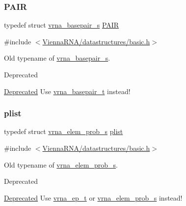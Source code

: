 \subsubsection{\texorpdfstring{P\+A\+IR}{PAIR}}
{\footnotesize\ttfamily typedef struct \hyperlink{group__data__structures_structvrna__basepair__s}{vrna\+\_\+basepair\+\_\+s} \hyperlink{group__data__structures_ga4381025ffbd692e54189b2c679c79c99}{P\+A\+IR}}



{\ttfamily \#include $<$\hyperlink{datastructures_2basic_8h}{Vienna\+R\+N\+A/datastructures/basic.\+h}$>$}



Old typename of \hyperlink{group__data__structures_structvrna__basepair__s}{vrna\+\_\+basepair\+\_\+s}. 

\begin{DoxyRefDesc}{Deprecated}
\item[\hyperlink{deprecated__deprecated000197}{Deprecated}]Use \hyperlink{group__data__structures_gac8c5669d3fb813cacf506489689305ce}{vrna\+\_\+basepair\+\_\+t} instead! \end{DoxyRefDesc}
\mbox{\label{group__data__structures_ga9608eed021ebfbdd7a901cfdc446c8e9}} 
\subsubsection{\texorpdfstring{plist}{plist}}
{\footnotesize\ttfamily typedef struct \hyperlink{group__struct__utils__plist_structvrna__elem__prob__s}{vrna\+\_\+elem\+\_\+prob\+\_\+s} \hyperlink{group__data__structures_ga9608eed021ebfbdd7a901cfdc446c8e9}{plist}}



{\ttfamily \#include $<$\hyperlink{datastructures_2basic_8h}{Vienna\+R\+N\+A/datastructures/basic.\+h}$>$}



Old typename of \hyperlink{group__struct__utils__plist_structvrna__elem__prob__s}{vrna\+\_\+elem\+\_\+prob\+\_\+s}. 

\begin{DoxyRefDesc}{Deprecated}
\item[\hyperlink{deprecated__deprecated000198}{Deprecated}]Use \hyperlink{group__struct__utils__plist_gab9ac98ab55ded9fb90043b024b915aca}{vrna\+\_\+ep\+\_\+t} or \hyperlink{group__struct__utils__plist_structvrna__elem__prob__s}{vrna\+\_\+elem\+\_\+prob\+\_\+s} instead! \end{DoxyRefDesc}
\mbox{\label{group__data__structures_ga8412f116a2eb07b59ade9e14ca7c5ef1}} 
